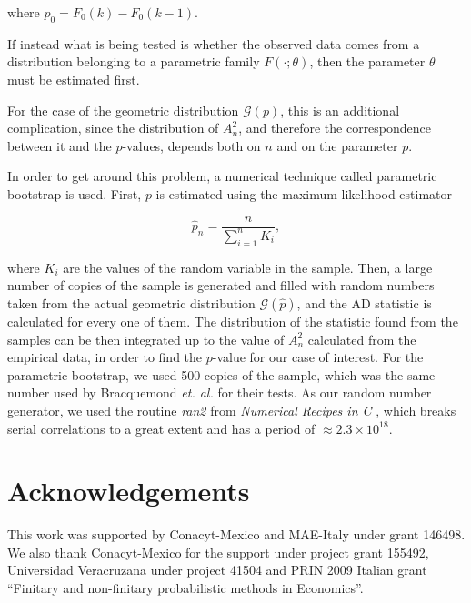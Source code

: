 \documentclass[a4paper]{jpconf}
\begin{document}
\begin{appendices}
 \noindent
 where $p_0=F_0(k) - F_0(k-1)$.
 
 
 If instead what is being tested is whether the observed data comes from a
 distribution belonging to a parametric family $F(\cdot;\theta)$, then the parameter $\theta$
 must be estimated first.

 For the case of the geometric distribution $\mathcal{G}(p)$,
 this is an additional complication,
 since the distribution of $A_n^2$, and therefore the correspondence between it and the
 $p$-values, depends both on $n$ and on the parameter $p$.
 
 In order to get around this problem, a numerical technique called parametric bootstrap is
 used. First, $p$ is estimated using the maximum-likelihood estimator
 
 \begin{equation}
 \label{eq_maximum_likelihood}
 \hat{p}_n=\frac{n}{\sum_{i=1}^n K_i},
 \end{equation}
 
 \noindent
 where $K_i$ are the values of the random variable in the sample.
 Then, a large number of copies of the sample is  generated and filled with random numbers
 taken from the actual geometric distribution $\mathcal{G}(\hat{p})$, and the AD statistic
 is calculated for every one of them.
 The distribution of the statistic found from the samples can be then integrated up to the
 value of $A_n^2$ calculated from the empirical data, in order to find the $p$-value for our
 case of interest.
 For the parametric bootstrap,  we used 500 copies of the sample,
 which was the same number used by Bracquemond {\it et. al.} \cite{BraCreGau} for their tests.
 As our random number generator, we used the routine {\it ran2} from
 {\it Numerical Recipes in C} \cite{Recipes}, which breaks serial correlations to a
 great extent and has a period of $\approx 2.3 \times 10^{18}$.
  \end{appendices}


\section*{Acknowledgements}
This work was supported by Conacyt-Mexico and MAE-Italy under grant 146498. We also thank Conacyt-Mexico for the support under  project grant 155492, Universidad Veracruzana under project 41504 and PRIN 2009 Italian grant ``Finitary and
non-finitary probabilistic methods in Economics''.
\end{document}

